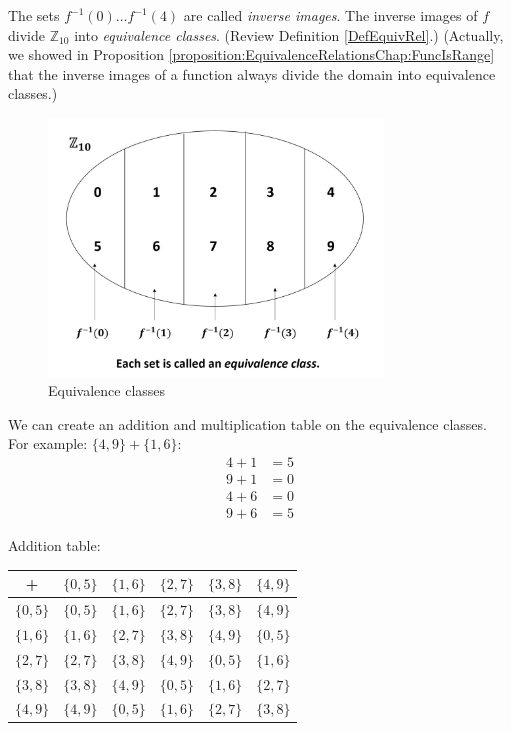 \begin{example}{}
The sets $f^{-1}(0)\dots f^{-1}(4)$ are called \textit{inverse images}. The inverse images of $f$ divide ${\mathbb Z}_{10}$ into \textit{equivalence classes}.  (Review Definition \ref{DefEquivRel}.)
(Actually, we showed in Proposition \ref{proposition:EquivalenceRelationsChap:FuncIsRange} that the inverse images of a function always divide the domain into equivalence classes.)\\

\begin{figure}[H]
\begin{center}
\centerline {
\includegraphics[width=3.5in]{images/Equivalence Class Image.jpg} }
\end{center}
\caption{Equivalence classes}\label{fig:equiv_class}
\end{figure}

We can create an addition and multiplication table on the equivalence classes. For example: $\{4,9\}+\{1,6\}$:
\begin{align*}
4+1&=5\\
9+1&=0\\
4+6&=0\\
9+6&=5
\end{align*}

Addition table:

\begin{center}
\begin{tabular}{c|c|c|c|c|c}
+ & $\{0,5\}$ & $\{1,6\}$ & $\{2,7\}$ & $\{3,8\}$ & $\{4,9\}$ \\
\hline
$\{0,5\}$ & $\{0,5\}$ & $\{1,6\}$ & $\{2,7\}$ & $\{3,8\}$ & $\{4,9\}$ \\
\hline
$\{1,6\}$ & $\{1,6\}$ & $\{2,7\}$ & $\{3,8\}$ & $\{4,9\}$ & $\{0,5\}$ \\
\hline
$\{2,7\}$ & $\{2,7\}$ & $\{3,8\}$ & $\{4,9\}$ & $\{0,5\}$ & $\{1,6\}$ \\
\hline
$\{3,8\}$ & $\{3,8\}$ & $\{4,9\}$ & $\{0,5\}$ & $\{1,6\}$ & $\{2,7\}$ \\
\hline
$\{4,9\}$ & $\{4,9\}$ & $\{0,5\}$ & $\{1,6\}$ & $\{2,7\}$ & $\{3,8\}$ 
\end{tabular}\\
\end{center}


\end{example}
